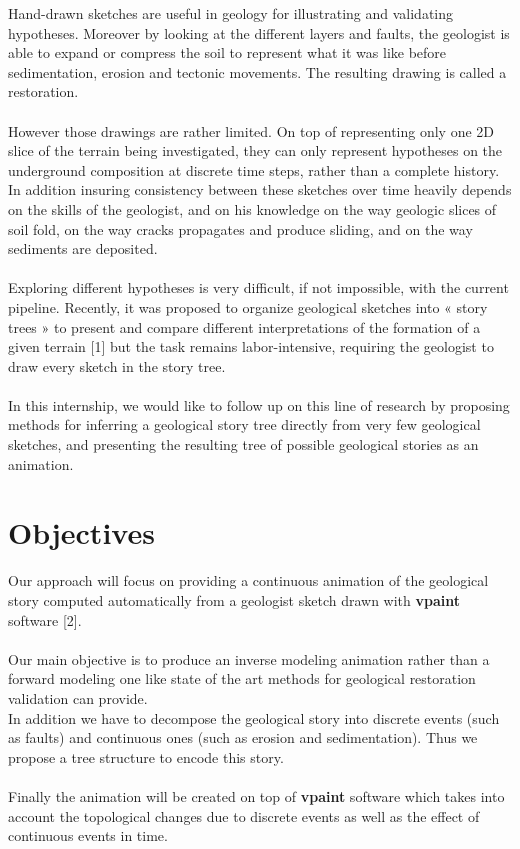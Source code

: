 \documentclass[a4paper,11pt]{article}
\begin{document}
Hand-drawn sketches are useful in geology for illustrating and validating hypotheses. Moreover by looking at the different layers and faults, the geologist is able to expand or compress the soil to represent what it was like before sedimentation, erosion and tectonic movements. The resulting drawing is called a restoration.\\\\
However those drawings are rather limited. On top of representing only one 2D slice of the terrain being investigated, they can only represent hypotheses on the underground composition at discrete time steps, rather than a complete history. 
In addition insuring consistency between these sketches over time heavily depends on the skills of the geologist, and on his knowledge on the way geologic slices of soil fold, on the way cracks propagates and produce sliding, and on the way sediments are deposited.\\\\ 
Exploring different hypotheses is very difficult, if not impossible, with the current pipeline.
Recently, it was proposed to organize geological sketches into « story trees » to present and
compare different interpretations of the formation of a given terrain [1] but the task remains
labor-intensive, requiring the geologist to draw every sketch in the story tree. \\\\
In this internship, we would like to follow up on this line of research by proposing methods for inferring a
geological story tree directly from very few geological sketches, and presenting the resulting tree of
possible geological stories as an animation.

\section{Objectives}

Our approach will focus on providing a continuous animation of the geological story computed automatically from a geologist sketch drawn with \textbf{vpaint} software [2]. \\\\
Our main objective is to produce an inverse modeling animation rather than a forward modeling one like state of the art methods for geological restoration validation can provide.\\
In addition we have to decompose the geological story into discrete events (such as faults) and continuous ones (such as erosion and sedimentation). Thus we propose a tree structure to encode this story.\\\\
Finally the animation will be created on top of \textbf{vpaint} software which takes into account the topological changes due to discrete events as well as the effect of continuous events in time.
\end{document}
